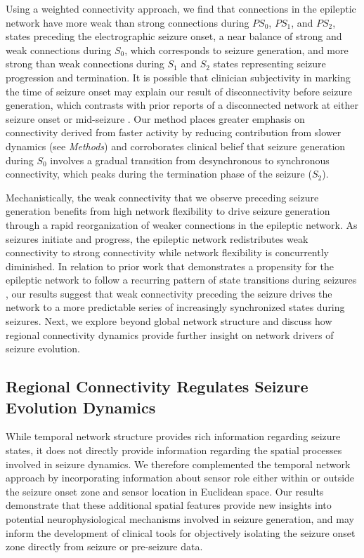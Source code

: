 Using a weighted connectivity approach, we find that connections in the epileptic network have more weak than strong connections during $PS_0$, $PS_1$, and $PS_2$, states preceding the electrographic seizure onset, a near balance of strong and weak connections during $S_0$, which corresponds to seizure generation, and more strong than weak connections during $S_1$ and $S_2$ states representing seizure progression and termination. It is possible that clinician subjectivity in marking the time of seizure onset may explain our result of disconnectivity before seizure generation, which contrasts with prior reports of a disconnected network at either seizure onset or mid-seizure . Our method places greater emphasis on connectivity derived from faster activity by reducing contribution from slower dynamics (see \textit{Methods}) and corroborates clinical belief that seizure generation during $S_0$ involves a gradual transition from desynchronous to synchronous connectivity, which peaks during the termination phase of the seizure ($S_2$). 

Mechanistically, the weak connectivity that we observe preceding seizure generation benefits from high network flexibility to drive seizure generation through a rapid reorganization of weaker connections in the epileptic network. As seizures initiate and progress, the epileptic network redistributes weak connectivity to strong connectivity while network flexibility is concurrently diminished. In relation to prior work that demonstrates a propensity for the epileptic network to follow a recurring pattern of state transitions during seizures \cite{burns2014network}, our results suggest that weak connectivity preceding the seizure drives the network to a more predictable series of increasingly synchronized states during seizures. Next, we explore beyond global network structure and discuss how regional connectivity dynamics provide further insight on network drivers of seizure evolution.

\subsection{Regional Connectivity Regulates Seizure Evolution Dynamics}
While temporal network structure provides rich information regarding seizure states, it does not directly provide information regarding the spatial processes involved in seizure dynamics. We therefore complemented the temporal network approach by incorporating information about sensor role either within or outside the seizure onset zone and sensor location in Euclidean space. Our results demonstrate that these additional spatial features provide new insights into potential neurophysiological mechanisms involved in seizure generation, and may inform the development of clinical tools for objectively isolating the seizure onset zone directly from seizure or pre-seizure data.

